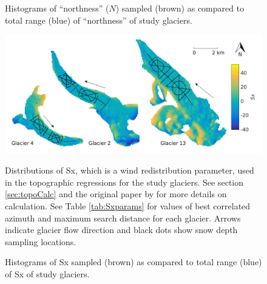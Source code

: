 \documentclass[12pt]{article}
\newcommand{\topomap}{Arrows indicate glacier flow direction and black dots show snow depth sampling locations. }
\begin{document}
\begin{figure}[H]
	\caption{Histograms of ``northness'' ($N$) sampled (brown) as compared to total range (blue) of ``northness'' of study glaciers.}
	\label{sampledRange:northness}
\end{figure}

\begin{figure}[H]
	\centering
	\includegraphics[width=\textwidth]{Map_Sx.png}\\
	\caption{Distributions of Sx, which is a wind redistribution parameter, used in the topographic regressions for the study glaciers. See section \ref{sec:topoCalc} and the original paper by \cite{Winstral2002} for more details on calculation. See Table \ref{tab:Sxparams} for values of best correlated azimuth and maximum search distance for each glacier. \topomap}
	\label{map:Sx}
\end{figure}

\begin{figure}[H]
	\caption{Histograms of Sx sampled (brown) as compared to total range (blue) of Sx of study glaciers.}
	\label{sampledRange:Sx}
\end{figure}
\end{document}
